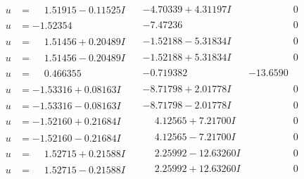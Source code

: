 \documentclass[1p]{elsarticle_modified}
\theoremstyle{definition}
\begin{document}
$$\begin{array}{c|c|c}
\begin{aligned}
u &= \phantom{-}1.51915 - 0.11525 I\end{aligned}
 & -4.70339 + 4.31197 I & \phantom{-0.000000 } 0 \\ \hline\begin{aligned}
u &= -1.52354\phantom{ +0.000000I}\end{aligned}
 & -7.47236\phantom{ +0.000000I} & \phantom{-0.000000 } 0 \\ \hline\begin{aligned}
u &= \phantom{-}1.51456 + 0.20489 I\end{aligned}
 & -1.52188 - 5.31834 I & \phantom{-0.000000 } 0 \\ \hline\begin{aligned}
u &= \phantom{-}1.51456 - 0.20489 I\end{aligned}
 & -1.52188 + 5.31834 I & \phantom{-0.000000 } 0 \\ \hline\begin{aligned}
u &= \phantom{-}0.466355\phantom{ +0.000000I}\end{aligned}
 & -0.719382\phantom{ +0.000000I} & -13.6590\phantom{ +0.000000I} \\ \hline\begin{aligned}
u &= -1.53316 + 0.08163 I\end{aligned}
 & -8.71798 + 2.01778 I & \phantom{-0.000000 } 0 \\ \hline\begin{aligned}
u &= -1.53316 - 0.08163 I\end{aligned}
 & -8.71798 - 2.01778 I & \phantom{-0.000000 } 0 \\ \hline\begin{aligned}
u &= -1.52160 + 0.21684 I\end{aligned}
 & \phantom{-}4.12565 + 7.21700 I & \phantom{-0.000000 } 0 \\ \hline\begin{aligned}
u &= -1.52160 - 0.21684 I\end{aligned}
 & \phantom{-}4.12565 - 7.21700 I & \phantom{-0.000000 } 0 \\ \hline\begin{aligned}
u &= \phantom{-}1.52715 + 0.21588 I\end{aligned}
 & \phantom{-}2.25992 - 12.63260 I & \phantom{-0.000000 } 0 \\ \hline\begin{aligned}
u &= \phantom{-}1.52715 - 0.21588 I\end{aligned}
 & \phantom{-}2.25992 + 12.63260 I & \phantom{-0.000000 } 0 \\ \hline\begin{aligned}

\end{aligned}
\end{array}$$
\end{document}
